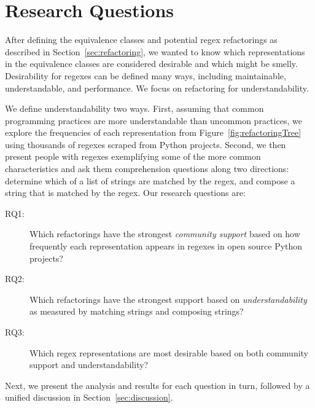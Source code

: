 






\section{Research Questions}
\label{sec:study}
After defining the equivalence classes and potential  regex refactorings as described in Section~\ref{sec:refactoring}, we wanted to know which representations in the equivalence classes  are considered desirable and which might be smelly. Desirability for regexes can be defined many ways, including maintainable,  understandable, and performance. 
We focus on refactoring for understandability.

We define understandability two ways. First, assuming that common programming practices are more understandable than uncommon practices, we explore the frequencies of each representation from Figure~\ref{fig:refactoringTree} using thousands of regexes scraped from Python projects. Second, we then present people with regexes exemplifying some of the more common characteristics and ask them comprehension questions along two directions: determine which of a list of strings are matched by the regex, and compose a string that is matched by the regex. Our  research questions are:

\begin{description}
\item[RQ1:] Which refactorings have the strongest \emph{community support} based on how frequently each representation appears in regexes in open source Python projects?
\item[RQ2:] Which refactorings have the strongest support based on \emph{understandability} as measured by matching strings and composing strings?
\item[RQ3:] Which regex representations are most desirable based on both community support and understandability?
\end{description}

Next, we present the analysis and results for each  question in turn, followed by a unified discussion in Section~\ref{sec:discussion}. 

